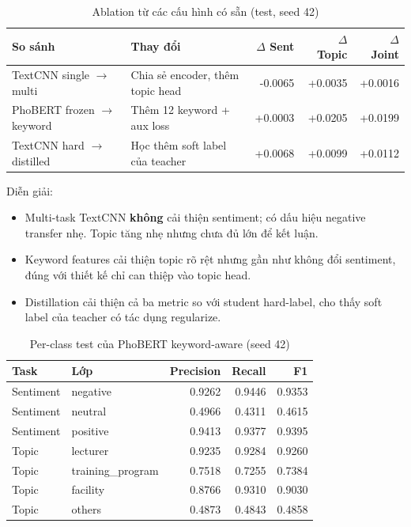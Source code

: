 \documentclass[12pt,a4paper]{report}
\begin{document}
\begin{table}[H]
\centering
\caption{Ablation từ các cấu hình có sẵn (test, seed 42)}
\label{tab:ablation}
\begin{tabularx}{\textwidth}{@{}lXrrr@{}}
\toprule
\textbf{So sánh} & \textbf{Thay đổi} & \textbf{\(\Delta\) Sent} & \textbf{\(\Delta\) Topic} & \textbf{\(\Delta\) Joint} \\
\midrule
TextCNN single \(\rightarrow\) multi & Chia sẻ encoder, thêm topic head & -0.0065 & +0.0035 & +0.0016 \\
PhoBERT frozen \(\rightarrow\) keyword & Thêm 12 keyword + aux loss & +0.0003 & +0.0205 & +0.0199 \\
TextCNN hard \(\rightarrow\) distilled & Học thêm soft label của teacher & +0.0068 & +0.0099 & +0.0112 \\
\bottomrule
\end{tabularx}
\end{table}

Diễn giải:

\begin{itemize}[leftmargin=1.2cm]
  \item Multi-task TextCNN \textbf{không} cải thiện sentiment; có dấu hiệu negative transfer nhẹ. Topic tăng nhẹ nhưng chưa đủ lớn để kết luận.
  \item Keyword features cải thiện topic rõ rệt nhưng gần như không đổi sentiment, đúng với thiết kế chỉ can thiệp vào topic head.
  \item Distillation cải thiện cả ba metric so với student hard-label, cho thấy soft label của teacher có tác dụng regularize.
\end{itemize}

\begin{table}[H]
\centering
\caption{Per-class test của PhoBERT keyword-aware (seed 42)}
\begin{tabular}{@{}llrrr@{}}
\toprule
\textbf{Task} & \textbf{Lớp} & \textbf{Precision} & \textbf{Recall} & \textbf{F1} \\
\midrule
Sentiment & negative & 0.9262 & 0.9446 & 0.9353 \\
Sentiment & neutral & 0.4966 & 0.4311 & 0.4615 \\
Sentiment & positive & 0.9413 & 0.9377 & 0.9395 \\
\midrule
Topic & lecturer & 0.9235 & 0.9284 & 0.9260 \\
Topic & training\_program & 0.7518 & 0.7255 & 0.7384 \\
Topic & facility & 0.8766 & 0.9310 & 0.9030 \\
Topic & others & 0.4873 & 0.4843 & 0.4858 \\
\bottomrule
\end{tabular}
\end{table}
\end{document}
